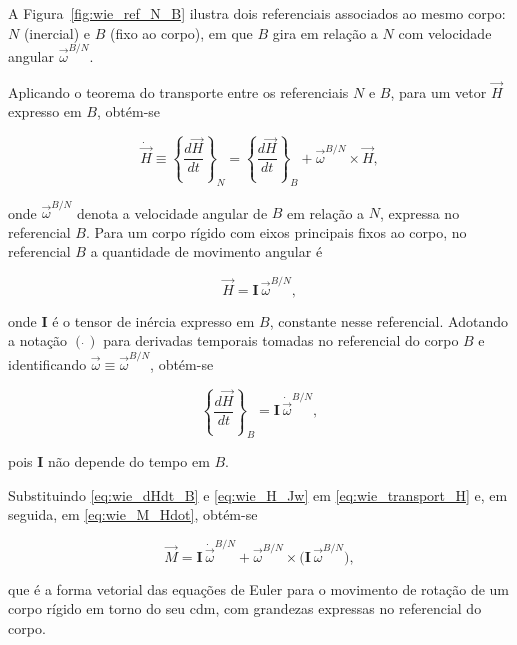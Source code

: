 A Figura~\ref{fig:wie_ref_N_B} ilustra dois referenciais associados ao mesmo corpo: $N$ (inercial) e $B$ (fixo ao corpo), em que $B$ gira em relação a $N$ com velocidade angular $\vec{\omega}^{B/N}$.

Aplicando o teorema do transporte entre os referenciais $N$ e $B$, para um vetor $\vec{H}$ expresso em $B$, obtém-se

\begin{equation}
\dot{\vec{H}}
\equiv
\left\{ \frac{d\vec{H}}{dt} \right\}_{N}
=
\left\{ \frac{d\vec{H}}{dt} \right\}_{B}
+
\vec{\omega}^{B/N} \times \vec{H},
\label{eq:wie_transport_H}
\end{equation}

onde $\vec{\omega}^{B/N}$ denota a velocidade angular de $B$ em relação a $N$, expressa no referencial $B$.
Para um corpo rígido com eixos principais fixos ao corpo, no referencial $B$ a quantidade de movimento angular é

\begin{equation}
\vec{H}
= \mathbf{I}\,\vec{\omega}^{B/N},
\label{eq:wie_H_Jw}
\end{equation}

onde $\mathbf{I}$ é o tensor de inércia expresso em $B$, constante nesse referencial.
Adotando a notação $(\dot{\,})$ para derivadas temporais tomadas no referencial do corpo $B$ e identificando $\vec{\omega}\equiv\vec{\omega}^{B/N}$, obtém-se

\begin{equation}
\left\{ \frac{d\vec{H}}{dt} \right\}_{B}
=
\mathbf{I}\,\dot{\vec{\omega}}^{B/N},
\label{eq:wie_dHdt_B}
\end{equation}

pois $\mathbf{I}$ não depende do tempo em $B$.


Substituindo \eqref{eq:wie_dHdt_B} e \eqref{eq:wie_H_Jw} em \eqref{eq:wie_transport_H} e, em seguida, em \eqref{eq:wie_M_Hdot}, obtém-se

\begin{equation}
\vec{M}
=
\mathbf{I}\,\dot{\vec{\omega}}^{B/N}
+
\vec{\omega}^{B/N} \times
\big( \mathbf{I}\,\vec{\omega}^{B/N} \big),
\label{eq:euler_rotacional_wie}
\end{equation}

que é a forma vetorial das equações de Euler para o movimento de rotação de um corpo rígido em torno do seu \gls{cdm}, com grandezas expressas no referencial do corpo.

